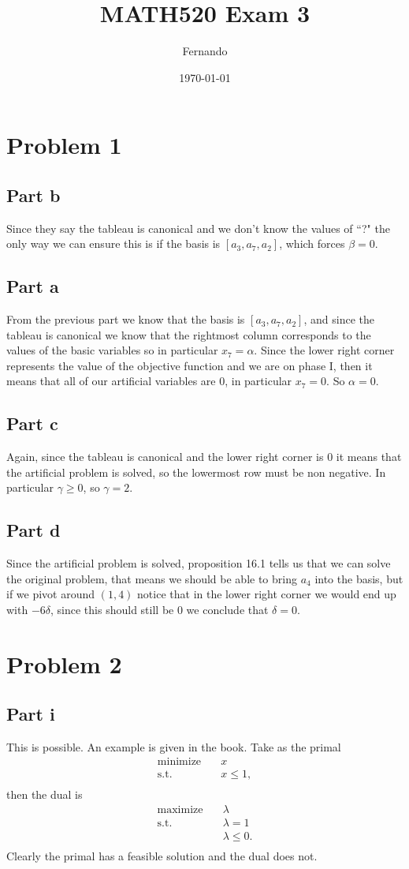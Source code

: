 \documentclass{article}
\begin{document}
\title{MATH520 Exam 3}
\author{Fernando}
\date{\today}
\maketitle

\section*{Problem 1}
\subsection*{Part b}
Since they say the tableau is canonical and we don't know the values of ``?"
the only way we can ensure this is if the basis is $[a_3,a_7,a_2]$, which forces $\beta=0$.
\subsection*{Part a}
From the previous part we know that the basis is $[a_3,a_7,a_2]$, and since the
tableau is canonical we know that the rightmost column corresponds to the
values of the basic variables so in particular $x_7=\alpha$. Since the lower
right corner represents the value of the objective function and we are on phase
I, then it means that all of our artificial variables are 0, in particular
$x_7=0$. So $\alpha=0$.
\subsection*{Part c}
Again, since the tableau is canonical and the lower right corner is 0 it means
that the artificial problem is solved, so the lowermost row must be non
negative. In particular $\gamma\geq0$, so $\gamma=2$.
\subsection*{Part d}
Since the artificial problem is solved, proposition 16.1 tells us that we can
solve the original problem, that means we should be able to bring $a_4$ into
the basis, but if we pivot around $(1,4)$ notice that in the lower right corner
we would end up with $-6\delta$, since this should still be 0 we conclude that
$\delta=0$.
\section*{Problem 2}
\subsection*{Part i}
This is possible. An example is given in the book. Take as the primal
\[
\begin{aligned}
\text{minimize}\quad & x\\
\textrm{s.t.} \quad &x\leq 1,\\
\end{aligned}
\]
then the dual is
\[
\begin{aligned}
\text{maximize}\quad & \lambda\\
\textrm{s.t.} \quad &\lambda= 1\\
\quad &\lambda\leq 0.\\
\end{aligned}
\]
Clearly the primal has a feasible solution and the dual does not.
\end{document}
